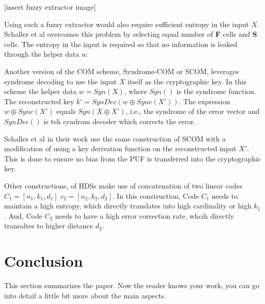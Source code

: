 \documentclass[journal, a4paper]{IEEEtran}
\begin{document}
[insert fuzzy extractor image]

Using such a fuzzy extractor would also require sufficient entropy in the input \(X\). Schaller et al overcomes this problem by selecting equal number of \textbf{F} cells and \textbf{S} cells. The entropy in the input is required so that no information is leaked through the helper data \(w\).

Another version of the COM scheme, Syndrome-COM or SCOM,\cite{COM} leverages syndrome decoding to use the input \(X\) itself as the cryptographic key. In this scheme the helper data \(w = Syn(X)\), where \(Syn()\) is the syndrome function. The reconstructed key \(k' = SynDec(w \oplus Sync(X'))\). The expression \(w \oplus Sync(X')\) equals \(Syn(X \oplus X')\), i.e., the syndrome of the error vector and \(SynDec()\) is teh syndrom decoder which corrects the error.

Schaller et al in their work use the same construction of SCOM with a modification of using a key derivation function on the reconstructed input \(X'\). This is done to ensure no bias from the PUF is transferred into the cryptographic key.

Other constructions, of HDSs make use of concatenation of two linear codes \(C_{1} = [n_{1}, k_{1}, d_{1}]\) \( c_{2} = [n_{2}, k_{2}, d_{2}]\).\cite{HDS15} In this construction, Code \(C_{1}\) needs to maintain a high entropy, which directly translates into high cardinality or high \(k_{1}\). And, Code \(C_{2}\) needs to have a high error correction rate, whcih directly transaltes to higher distance \(d_{2}\).

\section{Conclusion}
This section summarizes the paper. Now the reader knows your work, you can go into detail a little bit more about the main aspects.
\end{document}
